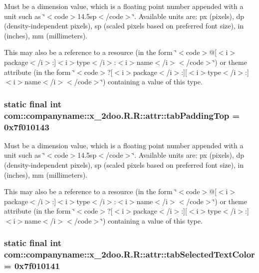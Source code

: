 Must be a dimension value, which is a floating point number appended with a unit such as \char`\"{}$<$code$>$14.5sp$<$/code$>$\char`\"{}. Available units are: px (pixels), dp (density-independent pixels), sp (scaled pixels based on preferred font size), in (inches), mm (millimeters). 

This may also be a reference to a resource (in the form \char`\"{}$<$code$>$@\mbox{[}$<$i$>$package$<$/i$>$:\mbox{]}$<$i$>$type$<$/i$>$:$<$i$>$name$<$/i$>$$<$/code$>$\char`\"{}) or theme attribute (in the form \char`\"{}$<$code$>$?\mbox{[}$<$i$>$package$<$/i$>$:\mbox{]}\mbox{[}$<$i$>$type$<$/i$>$:\mbox{]}$<$i$>$name$<$/i$>$$<$/code$>$\char`\"{}) containing a value of this type. \hypertarget{classcom_1_1companyname_1_1x__2doo_1_1_r_1_1attr_e30f3321b748e9f13145e079c434833b}{
\subsubsection[{tabPaddingTop}]{\setlength{\rightskip}{0pt plus 5cm}static final int com::companyname::x\_\-2doo.R.R::attr::tabPaddingTop = 0x7f010143}}
\label{classcom_1_1companyname_1_1x__2doo_1_1_r_1_1attr_e30f3321b748e9f13145e079c434833b}


Must be a dimension value, which is a floating point number appended with a unit such as \char`\"{}$<$code$>$14.5sp$<$/code$>$\char`\"{}. Available units are: px (pixels), dp (density-independent pixels), sp (scaled pixels based on preferred font size), in (inches), mm (millimeters). 

This may also be a reference to a resource (in the form \char`\"{}$<$code$>$@\mbox{[}$<$i$>$package$<$/i$>$:\mbox{]}$<$i$>$type$<$/i$>$:$<$i$>$name$<$/i$>$$<$/code$>$\char`\"{}) or theme attribute (in the form \char`\"{}$<$code$>$?\mbox{[}$<$i$>$package$<$/i$>$:\mbox{]}\mbox{[}$<$i$>$type$<$/i$>$:\mbox{]}$<$i$>$name$<$/i$>$$<$/code$>$\char`\"{}) containing a value of this type. \hypertarget{classcom_1_1companyname_1_1x__2doo_1_1_r_1_1attr_f6f03ebe873ffebed9b51b845065aa15}{
\subsubsection[{tabSelectedTextColor}]{\setlength{\rightskip}{0pt plus 5cm}static final int com::companyname::x\_\-2doo.R.R::attr::tabSelectedTextColor = 0x7f010141}}
\label{classcom_1_1companyname_1_1x__2doo_1_1_r_1_1attr_f6f03ebe873ffebed9b51b845065aa15}


